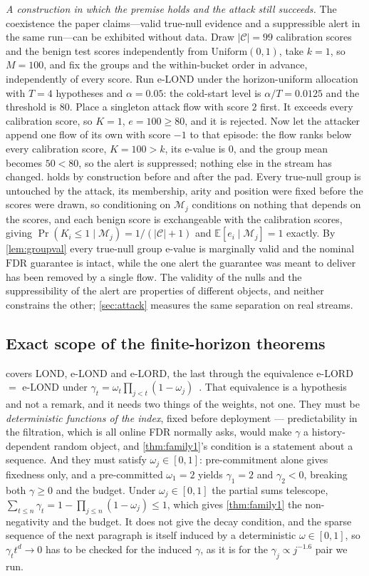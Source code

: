 \documentclass[conference]{IEEEtran}
\newcommand{\Cal}{\mathcal{C}}
\newcommand{\nCal}{\lvert\Cal\rvert}
\newcommand{\ceil}{M}
\newcommand{\FDR}{\mathrm{FDR}}
\begin{document}
\emph{A construction in which the premise holds and the attack still succeeds.} The coexistence the
paper claims---valid true-null evidence and a suppressible alert in the same run---can be exhibited
without data. Draw $\nCal=99$ calibration scores and the benign test scores independently from
$\mathrm{Uniform}(0,1)$, take $k=1$, so $\ceil=100$, and fix the groups and the within-bucket order in
advance, independently of every score. Run e-LOND under the horizon-uniform allocation with $T=4$
hypotheses and $\alpha=0.05$: the cold-start level is $\alpha/T=0.0125$ and the threshold is $80$.
Place a singleton attack flow with score $2$ first. It exceeds every calibration score, so $K=1$,
$e=100\ge80$, and it is rejected. Now let the attacker append one flow of its own with score $-1$ to
that episode: the flow ranks below every calibration score, $K=100>k$, its e-value is $0$, and the
group mean becomes $50<80$, so the alert is suppressed; nothing else in the stream has changed.
 holds by construction before and after the pad. Every true-null group is
untouched by the attack, its membership, arity and position were fixed before the scores were drawn, so
conditioning on $\mathcal M_j$ conditions on nothing that depends on the scores, and each benign score
is exchangeable with the calibration scores, giving
$\Pr(K_i\le1\mid\mathcal M_j)=1/(\nCal+1)$ and $\mathbb E[e_i\mid\mathcal M_j]=1$ exactly. By
\cref{lem:groupval} every true-null group e-value is marginally valid and the nominal $\FDR$ guarantee
is intact, while the one alert the guarantee was meant to deliver has been removed by a single flow.
The validity of the nulls and the suppressibility of the alert are properties of different objects,
and neither constrains the other; \cref{sec:attack} measures the same separation on real streams.

\subsection{Exact scope of the finite-horizon theorems}\label{app:horizonscope}

 covers LOND, e-LOND and e-LORD, the last through the equivalence e-LORD $=$ e-LOND
under $\gamma_t=\omega_t\prod_{j<t}(1-\omega_j)$~\cite{egai2025}. That equivalence is a hypothesis and
not a remark, and it needs two things of the weights, not one. They must be \emph{deterministic
functions of the index}, fixed before deployment --- predictability in the filtration, which is all
online FDR normally asks, would make $\gamma$ a history-dependent random object, and
\cref{thm:family1}'s condition is a statement about a sequence. And they must satisfy
$\omega_j\in[0,1]$: pre-commitment alone gives fixedness only, and a pre-committed $\omega_1=2$ yields
$\gamma_1=2$ and $\gamma_2<0$, breaking both $\gamma\ge0$ and the budget. Under
$\omega_j\in[0,1]$ the partial sums telescope, $\sum_{t\le n}\gamma_t=1-\prod_{j\le n}(1-\omega_j)\le1$,
which gives \cref{thm:family1} the non-negativity and the budget. It does not give the decay
condition, and the sparse sequence of the next paragraph is itself induced by a deterministic
$\omega\in[0,1]$, so $\gamma_t t^d\to0$ has to be checked for the induced $\gamma$, as it is for the
$\gamma_j\propto j^{-1.6}$ pair we run.
\end{document}
